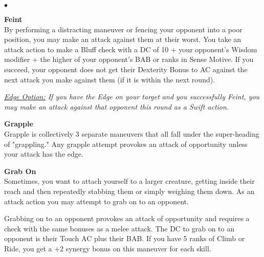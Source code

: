 \begin{list}{$\bullet$}{\itemspace}
\hypertarget{combat:feint}{}
\normalsize\item\textbf{{Feint}}\\\small
By performing a distracting maneuver or fencing your opponent into a poor position, you may make an attack against them at their worst. You take an attack action to make a Bluff check with a DC of 10 + your opponent's Wisdom modifier + the higher of your opponent's BAB or ranks in Sense Motive. If you succeed, your opponent does not get their Dexterity Bonus to AC against the next attack you make against them (if it is within the next round).

\smallskip\emph{\underline{Edge Option:} If you have the Edge on your target and you successfully Feint, you may make an attack against that opponent this round as a Swift action.}\\

\hypertarget{combat:grapple}{}
\normalsize\item\textbf{{Grapple}}\\\small
Grapple is collectively 3 separate maneuvers that all fall under the super-heading of "grappling." Any grapple attempt provokes an attack of opportunity unless your attack has the edge.

\listtwo\hypertarget{combat:grabon}{}
	  \normalsize\item\textbf{{Grab On}}\\\small
	  Sometimes, you want to attach yourself to a larger creature, getting inside their reach and then repeatedly stabbing them or simply weighing them down.  As an attack action you may attempt to grab on to an opponent.

	  Grabbing on to an opponent provokes an attack of opportunity and requires a check with the same bonuses as a melee attack. The DC to grab on to an opponent is their Touch AC plus their BAB. If you have 5 ranks of Climb or Ride, you get a +2 synergy bonus on this maneuver for each skill.




\end{list}
